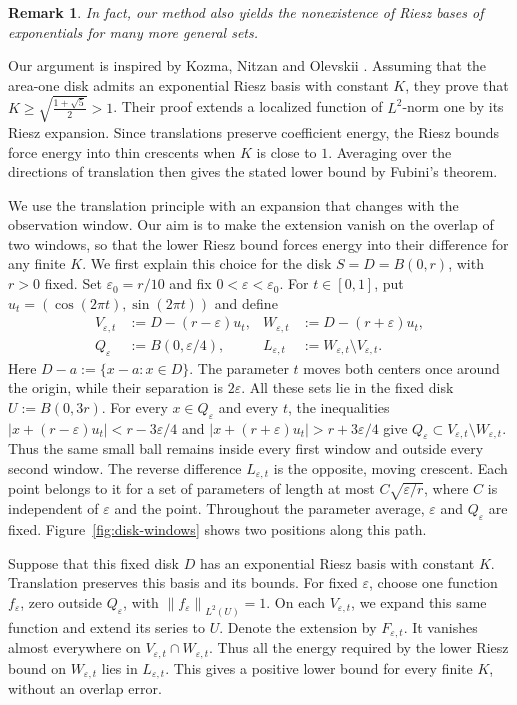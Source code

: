 \documentclass[12pt,reqno,tbtags]{amsart}
\newtheorem{remark}{Remark}[section]
\newcommand\1{\mathbbm{1}}
\newcommand\Norm[2]{\left\|#1\right\|_{#2}}
\newcommand{\eps}{\varepsilon}
\begin{document}
\begin{remark}\label{rem:more-general-sets}
In fact, our method also yields the nonexistence of Riesz bases of exponentials
for many more general sets.
\end{remark}

Our argument is inspired by Kozma, Nitzan and Olevskii \cite{KNO23}.
Assuming that the area-one disk admits an exponential Riesz basis with constant $K$,
they prove that $K\ge\sqrt{\frac{1+\sqrt{5}}{2}}>1$.
Their proof extends a localized function of $L^2$-norm one by its Riesz expansion.
Since translations preserve coefficient energy, the Riesz bounds force energy
into thin crescents when $K$ is close to $1$. Averaging over the directions
of translation then gives the stated lower bound by Fubini's theorem.

We use the translation principle with an expansion that changes with the
observation window. Our aim is to make the extension vanish on the overlap
of two windows, so that the lower Riesz bound forces energy into their
difference for any finite $K$. We first explain this choice for the disk
$S=D=B(0,r)$, with $r>0$ fixed. Set $\eps_0=r/10$ and fix
$0<\eps<\eps_0$. For $t\in[0,1]$, put
$u_t=(\cos(2\pi t),\sin(2\pi t))$ and define
\begin{equation*}
    \begin{aligned}
        V_{\eps,t}&:=D-(r-\eps)u_t,
        &W_{\eps,t}&:=D-(r+\eps)u_t,\\
        Q_\eps&:=B(0,\eps/4),
        &L_{\eps,t}&:=W_{\eps,t}\setminus V_{\eps,t}.
    \end{aligned}
\end{equation*}
Here $D-a:=\{x-a:x\in D\}$. The parameter $t$ moves both centers once around
the origin, while their separation is $2\eps$. All these sets lie in the fixed
disk $U:=B(0,3r)$. For every $x\in Q_\eps$ and every $t$, the inequalities
$|x+(r-\eps)u_t|<r-3\eps/4$ and $|x+(r+\eps)u_t|>r+3\eps/4$ give
$Q_\eps\subset V_{\eps,t}\setminus W_{\eps,t}$.
Thus the same small ball remains inside every first window and outside every
second window. The reverse difference $L_{\eps,t}$ is the opposite, moving
crescent. Each point belongs to it for a set of parameters of length at most
$C\sqrt{\eps/r}$, where $C$ is independent of $\eps$ and the point.
Throughout the parameter average, $\eps$ and $Q_\eps$ are fixed.
Figure~\ref{fig:disk-windows} shows two positions along this path.

Suppose that this fixed disk $D$ has an exponential Riesz basis with constant $K$.
Translation preserves this basis and its bounds. For fixed $\eps$, choose
one function $f_\eps$, zero outside $Q_\eps$, with $\Norm{f_\eps}{L^2(U)}=1$.
On each $V_{\eps,t}$, we expand this same function and extend its series to $U$.
Denote the extension by $F_{\eps,t}$.
It vanishes almost everywhere on $V_{\eps,t}\cap W_{\eps,t}$.
Thus all the energy required by the lower Riesz bound on $W_{\eps,t}$ lies
in $L_{\eps,t}$.
This gives a positive lower bound for every finite $K$, without an overlap error.
\end{document}
